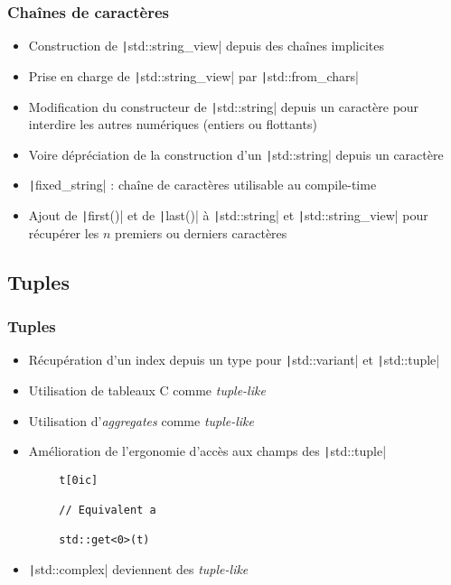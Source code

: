 \documentclass[C++.tex]{subfiles}
\begin{document}
\begin{frame}[fragile]
	\frametitle{Chaînes de caractères}
	\begin{itemize}
		\item Construction de \texttt|std::string_view| depuis des chaînes implicites
		\item Prise en charge de \texttt|std::string_view| par \texttt|std::from_chars|
		\item Modification du constructeur de \texttt|std::string| depuis un caractère pour interdire les autres numériques (entiers ou flottants)
		\item Voire dépréciation de la construction d'un \texttt|std::string| depuis un caractère
		\item \texttt|fixed_string| : chaîne de caractères utilisable au compile-time
		\item Ajout de \texttt|first()| et de \texttt|last()| à \texttt|std::string| et \texttt|std::string_view| pour récupérer les $n$ premiers ou derniers caractères
	\end{itemize}

\end{frame}

\subsection*{Tuples}
\begin{frame}[fragile]
	\frametitle{Tuples}
	\begin{itemize}
		\item Récupération d'un index depuis un type pour \texttt|std::variant| et \texttt|std::tuple|
		\item Utilisation de tableaux C comme \textit{tuple-like}
		\item Utilisation d'\textit{aggregates} comme \textit{tuple-like}
		\item Amélioration de l'ergonomie d'accès aux champs des \texttt|std::tuple|
	\end{itemize}

	\begin{verbatim}
		t[0ic]

		// Equivalent a

		std::get<0>(t)
	\end{verbatim}

	\begin{itemize}
		\item \texttt|std::complex| deviennent des \textit{tuple-like}
	\end{itemize}

\end{frame}
\end{document}
